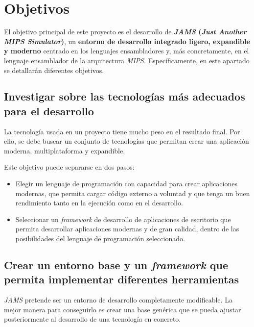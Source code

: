 \section{Objetivos}\label{sec:objetivos}

El objetivo principal de este proyecto es el desarrollo de \textbf{\textit{JAMS}
(\textit{Just Another MIPS Simulator})}, un \textbf{entorno de desarrollo integrado ligero, expandible y moderno}
centrado en los lenguajes ensambladores y, más concretamente,
en el lenguaje ensamblador de la arquitectura \textit{MIPS}.
Específicamente, en este apartado se detallarán diferentes objetivos.

\subsection{Investigar sobre las tecnologías más adecuados para el desarrollo}
\label{subsec:investigar-sobre-las-tecnologias-mas-adecuados-para-el-desarrollo}

La tecnología usada en un proyecto tiene mucho peso en el resultado final.
Por ello, se debe buscar un conjunto de tecnologías que permitan crear una aplicación
moderna, multiplataforma y expandible.

Este objetivo puede separarse en dos pasos:
\begin{itemize}
    \item Elegir un lenguaje de programación con capacidad para crear aplicaciones modernas,
    que permita cargar código externo a voluntad y que tenga un buen rendimiento
    tanto en la ejecución como en el desarrollo.
    \item Seleccionar un \textit{framework} de desarrollo de aplicaciones de escritorio
    que permita desarrollar aplicaciones modernas y de gran
    calidad, dentro de las posibilidades del lenguaje de
    programación seleccionado.
\end{itemize}

\subsection{Crear un entorno base y un \textit{framework} que permita implementar diferentes herramientas}
\label{subsec:crear-un-entorno-base-y-un-framework-que-permita-implementar-diferentes-herramientas}

\textit{JAMS} pretende ser un entorno de desarrollo completamente modificable.
La mejor manera para conseguirlo es crear una base genérica
que se pueda ajustar posteriormente al desarrollo de una tecnología en concreto.

